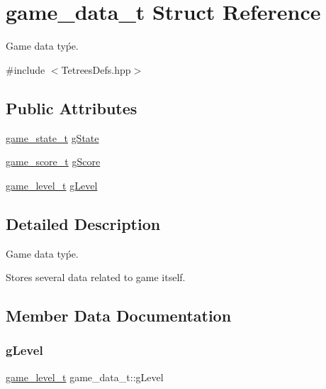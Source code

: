 \hypertarget{structgame__data__t}{}\section{game\+\_\+data\+\_\+t Struct Reference}
\label{structgame__data__t}


Game data tyṕe.  




{\ttfamily \#include $<$Tetrees\+Defs.\+hpp$>$}

\subsection*{Public Attributes}
\begin{DoxyCompactItemize}
\item 
\mbox{\hyperlink{TetreesDefs_8hpp_aebae08b2e3a36f1452b33acaf1eaab40}{game\+\_\+state\+\_\+t}} \mbox{\hyperlink{structgame__data__t_a48253f7b6212e0ff99d5d5960b79476d}{g\+State}}
\item 
\mbox{\hyperlink{structgame__score__t}{game\+\_\+score\+\_\+t}} \mbox{\hyperlink{structgame__data__t_a70e04b66160685cc84bcdd30edb97e46}{g\+Score}}
\item 
\mbox{\hyperlink{structgame__level__t}{game\+\_\+level\+\_\+t}} \mbox{\hyperlink{structgame__data__t_a7918ec335ac715bcf7ec197920afe56b}{g\+Level}}
\end{DoxyCompactItemize}


\subsection{Detailed Description}
Game data tyṕe. 

Stores several data related to game itself. 

\subsection{Member Data Documentation}
\mbox{\label{structgame__data__t_a7918ec335ac715bcf7ec197920afe56b}} 
\subsubsection{\texorpdfstring{g\+Level}{gLevel}}
{\footnotesize\ttfamily \mbox{\hyperlink{structgame__level__t}{game\+\_\+level\+\_\+t}} game\+\_\+data\+\_\+t\+::g\+Level}

